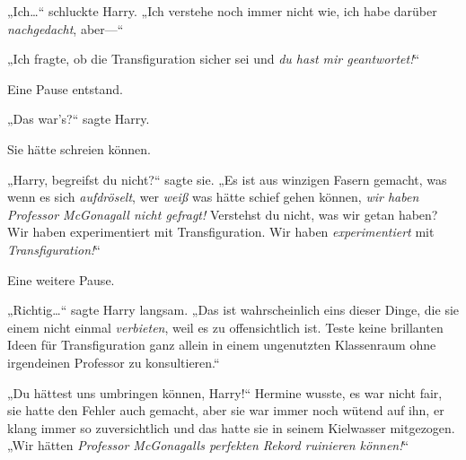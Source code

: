 „Ich…“ schluckte Harry. „Ich verstehe noch immer nicht wie, ich habe darüber \emph{nachgedacht}, aber—“

„Ich fragte, ob die Transfiguration sicher sei und \emph{du hast mir geantwortet!}“

Eine Pause entstand.

„Das war's?“ sagte Harry.

Sie hätte schreien können.

„Harry, begreifst du nicht?“ sagte sie. „Es ist aus winzigen Fasern gemacht, was wenn es sich \emph{aufdröselt}, wer \emph{weiß} was hätte schief gehen können, \emph{wir haben Professor McGonagall nicht gefragt!} Verstehst du nicht, was wir getan haben? Wir haben experimentiert mit Transfiguration. Wir haben \emph{experimentiert} mit \emph{Transfiguration!}“

Eine weitere Pause.

„Richtig…“ sagte Harry langsam. „Das ist wahrscheinlich eins dieser Dinge, die sie einem nicht einmal \emph{verbieten}, weil es zu offensichtlich ist. Teste keine brillanten Ideen für Transfiguration ganz allein in einem ungenutzten Klassenraum ohne irgendeinen Professor zu konsultieren.“

„Du hättest uns umbringen können, Harry!“ Hermine wusste, es war nicht fair, sie hatte den Fehler auch gemacht, aber sie war immer noch wütend auf ihn, er klang immer so zuversichtlich und das hatte sie in seinem Kielwasser mitgezogen. „Wir hätten \emph{Professor McGonagalls perfekten Rekord ruinieren können!}“

